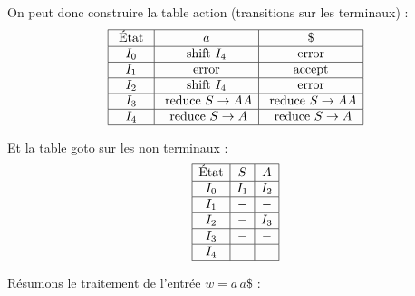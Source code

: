 \begin{example}
    \begin{center}
        \begin{minipage}{0.60\textwidth}
            On peut donc construire la table action (transitions sur les terminaux) : 
            \[ 
                \begin{array}{|c|c|c|}
                    \hline 
                    \text{ État } & a & \$ \\ 
                    \hline 
                    I_0 & \text{shift } I_4 & \text{error} \\ 
                    \hline 
                    I_1 & \text{error} & \text{accept} \\ 
                    \hline 
                    I_2 & \text{shift } I_4 & \text{error} \\ 
                    \hline 
                    I_3 & \text{ reduce } S \to AA & \text{ reduce } S \to AA \\ 
                    \hline 
                    I_4 & \text{ reduce } S \to A &  \text{ reduce } S \to A \\ 
                    \hline         
                \end{array}
            \] 
        \end{minipage}
        \hfill 
        \begin{minipage}{0.25\textwidth}
             Et la table goto sur les non terminaux : 
                \[ 
                    \begin{array}{|c|c|c|}
                        \hline 
                        \text{État} & S & A \\
                        \hline 
                        I_0 & I_1 & I_2 \\ 
                        \hline 
                        I_1 & - & - \\ 
                        \hline 
                        I_2 & - & I_3 \\ 
                        \hline 
                        I_3 & - & - \\ 
                        \hline 
                        I_4 & - & - \\ 
                        \hline  
                    \end{array}
                \] 
        \end{minipage}
    \end{center}

    Résumons le traitement de l'entrée \(w = a\,a\$\) : 


\end{example}
